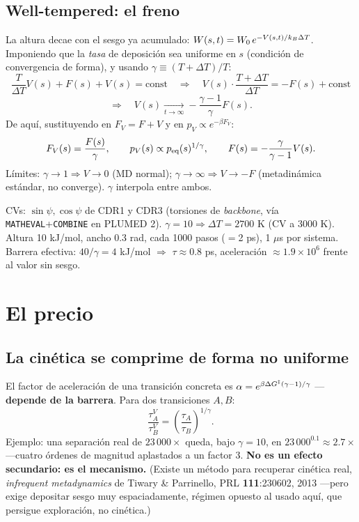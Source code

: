 \documentclass[11pt]{article}
\begin{document}
\subsection{Well-tempered: el freno}
La altura decae con el sesgo ya acumulado: $W(s,t)=W_0\,e^{-V(s,t)/k_B\Delta T}$. Imponiendo que la \emph{tasa} de deposición sea uniforme en $s$ (condición de convergencia de forma), y usando $\gamma\equiv(T+\Delta T)/T$:
$$\frac{T}{\Delta T}V(s) + F(s) + V(s) = \text{const} \quad\Longrightarrow\quad V(s)\cdot\frac{T+\Delta T}{\Delta T}=-F(s)+\text{const}$$
$$\Longrightarrow\quad \boxed{V(s)\xrightarrow[t\to\infty]{} -\frac{\gamma-1}{\gamma}F(s)}.$$
De aquí, sustituyendo en $F_V=F+V$ y en $p_V\propto e^{-\beta F_V}$:
$$F_V(s) = \frac{F(s)}{\gamma}, \qquad p_V(s) \propto p_{\text{eq}}(s)^{1/\gamma}, \qquad F(s) = -\frac{\gamma}{\gamma-1}V(s).$$
Límites: $\gamma\to1 \Rightarrow V\to0$ (MD normal); $\gamma\to\infty \Rightarrow V\to-F$ (metadinámica estándar, no converge). $\gamma$ interpola entre ambos.

\begin{center}
\resizebox{\textwidth}{!}{\MoldeNegativoFigure[1]}
\end{center}

\begin{resultado}
CVs: $\sin\psi,\cos\psi$ de CDR1 y CDR3 (torsiones de \emph{backbone}, vía \texttt{MATHEVAL}+\texttt{COMBINE} en PLUMED 2). $\gamma=10 \Rightarrow \Delta T=2700$ K (CV a 3000 K). Altura 10 kJ/mol, ancho 0.3 rad, cada 1000 pasos ($=$2 ps), 1 $\mu$s por sistema. Barrera efectiva: $40/\gamma=4$ kJ/mol $\Rightarrow$ $\tau\approx0.8$ ps, aceleración $\approx1.9\times10^6$ frente al valor sin sesgo.
\end{resultado}

\section{El precio}
\label{sec:precio}

\subsection{La cinética se comprime de forma no uniforme}
El factor de aceleración de una transición concreta es $\alpha = e^{\beta\Delta G^{\ddagger}(\gamma-1)/\gamma}$ —\textbf{depende de la barrera}. Para dos transiciones $A,B$:
$$\frac{\tau_A^V}{\tau_B^V} = \left(\frac{\tau_A}{\tau_B}\right)^{1/\gamma}.$$
Ejemplo: una separación real de $23\,000\times$ queda, bajo $\gamma=10$, en $23\,000^{0.1}\approx2.7\times$ —cuatro órdenes de magnitud aplastados a un factor 3. \textbf{No es un efecto secundario: es el mecanismo.} (Existe un método para recuperar cinética real, \emph{infrequent metadynamics} de Tiwary \& Parrinello, PRL \textbf{111}:230602, 2013 —pero exige depositar sesgo muy espaciadamente, régimen opuesto al usado aquí, que persigue exploración, no cinética.)
\end{document}
